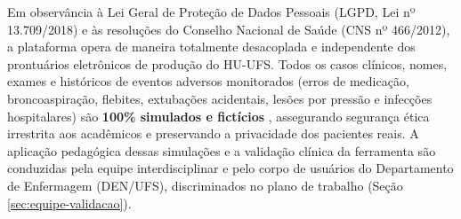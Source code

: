Em observância à Lei Geral de Proteção de Dados Pessoais (LGPD, Lei nº 13.709/2018) e às resoluções do Conselho Nacional de Saúde (CNS nº 466/2012), a plataforma opera de maneira totalmente desacoplada e independente dos prontuários eletrônicos de produção do HU-UFS. Todos os casos clínicos, nomes, exames e históricos de eventos adversos monitorados (erros de medicação, broncoaspiração, flebites, extubações acidentais, lesões por pressão e infecções hospitalares) são \textbf{100\% simulados e fictícios} \cite{borzecki2020}, assegurando segurança ética irrestrita aos acadêmicos e preservando a privacidade dos pacientes reais. A aplicação pedagógica dessas simulações e a validação clínica da ferramenta são conduzidas pela equipe interdisciplinar e pelo corpo de usuários do Departamento de Enfermagem (DEN/UFS), discriminados no plano de trabalho (Seção \ref{sec:equipe-validacao}).
